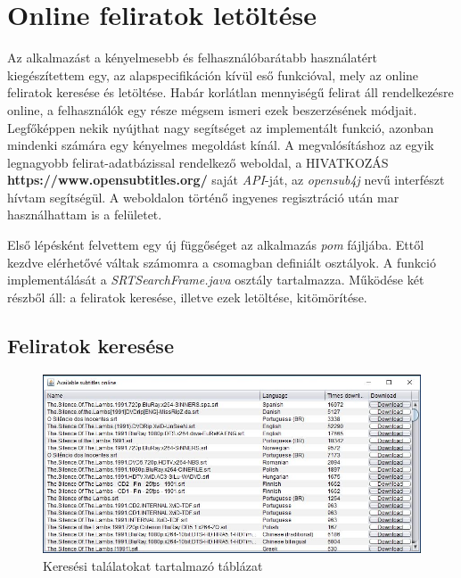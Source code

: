 \section{Online feliratok letöltése}

Az alkalmazást a kényelmesebb és felhasználóbarátabb használatért kiegészítettem egy, az alapspecifikáción kívül eső funkcióval, mely az online feliratok keresése és letöltése. Habár korlátlan mennyiségű felirat áll rendelkezésre online, a felhasználók egy része mégsem ismeri ezek beszerzésének módjait. Legfőképpen nekik nyújthat nagy segítséget az implementált funkció, azonban mindenki számára egy kényelmes megoldást kínál. A megvalósításhoz az egyik legnagyobb felirat-adatbázissal rendelkező weboldal, a HIVATKOZÁS \textbf{https://www.opensubtitles.org/} saját \textit{API}-ját, az \textit{opensub4j} nevű interfészt hívtam segítségül. A weboldalon történő ingyenes regisztráció után mar használhattam is a felületet.

Első lépésként felvettem egy új függőséget az alkalmazás \textit{pom} fájljába. Ettől kezdve elérhetővé váltak számomra a csomagban definiált osztályok. A funkció implementálását a \textit{SRTSearchFrame.java} osztály tartalmazza. Működése két részből áll: a feliratok keresése, illetve ezek letöltése, kitömörítése.

\subsection{Feliratok keresése}

\begin{figure}
  \includegraphics[width=\linewidth]{images/online_search.jpg}
  \caption{Keresési találatokat tartalmazó táblázat}
  \label{fig:online_search}
\end{figure}

